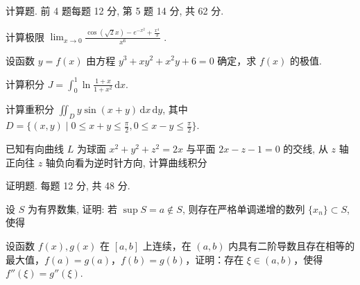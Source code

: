 \par{}
计算题. 前 4 题每题 12 分, 第 5 题 14 分, 共 62 分.\par
计算极限  $\lim_{x\to0}\frac{\cos(\sqrt{2}x)-e^{-x^{2}}+\frac{x^{4}}{3}}{x^{6}}$ .\par
设函数 $y = f(x)$ 由方程 $y^3 + xy^2 + x^2y + 6 = 0$ 确定，求 $f(x)$ 的极值.\par
计算积分 $J = \int_0^1 \ln \frac{1 + x}{1 + x^2} \, \mathrm{d}x$.\par
计算重积分 $\iint_{D} y \sin(x + y) \, \mathrm{d}x \, \mathrm{d}y$, 其中 $D = \{(x, y) \mid 0 \leq x + y \leq \frac{\pi}{2}, 0 \leq x - y \leq \frac{\pi}{2}\}$.\par
\par{}
已知有向曲线 $L$ 为球面 $x^{2} + y^{2} + z^{2} = 2x$ 与平面 $2x - z - 1 = 0$ 的交线, 从 $z$ 轴正向往 $z$ 轴负向看为逆时针方向, 计算曲线积分\par
\nopagebreak[4]
\par{}
证明题. 每题 12 分, 共 48 分.\par
\par{}
设 $S$ 为有界数集, 证明: 若 $\sup S = a \notin S$, 则存在严格单调递增的数列 $\{x_n\} \subset S$, 使得\par
\nopagebreak[4]
设函数 $f(x), g(x)$ 在 $[a, b]$ 上连续，在 $(a, b)$ 内具有二阶导数且存在相等的最大值，$f(a) = g(a)$，$f(b) = g(b)$，证明：存在 $\xi \in (a, b)$，使得 $f''(\xi) = g''(\xi)$.\par
